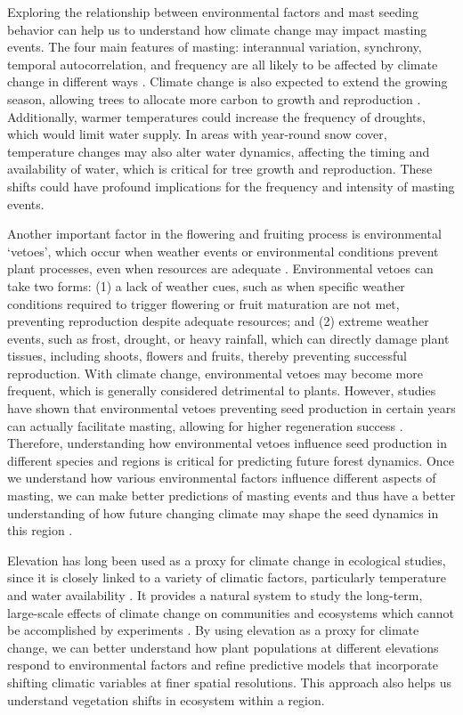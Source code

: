 \documentclass[11pt,letter]{article}
\begin{document}
Exploring the relationship between environmental factors and mast seeding behavior can help us to understand how climate change may impact masting events. The four main features of masting: interannual variation, synchrony, temporal autocorrelation, and frequency are all likely to be affected by climate change in different ways \citep{hacket2021climate}. Climate change is also expected to extend the growing season, allowing trees to allocate more carbon to growth and reproduction \citep{keenan2014net}. Additionally, warmer temperatures could increase the frequency of droughts, which would limit water supply. In areas with year-round snow cover, temperature changes may also alter water dynamics, affecting the timing and availability of water, which is critical for tree growth and reproduction. These shifts could have profound implications for the frequency and intensity of masting events.\par

Another important factor in the flowering and fruiting process is environmental `vetoes', which occur when weather events or environmental conditions prevent plant processes, even when resources are adequate \citep{bogdziewicz2022will}. Environmental vetoes can take two forms: (1) a lack of weather cues, such as when specific weather conditions required to trigger flowering or fruit maturation are not met, preventing reproduction despite adequate resources; and (2) extreme weather events, such as frost, drought, or heavy rainfall, which can directly damage plant tissues, including shoots, flowers and fruits, thereby preventing successful reproduction. With climate change, environmental vetoes may become more frequent, which is generally considered detrimental to plants. However, studies have shown that environmental vetoes preventing seed production in certain years can actually facilitate masting, allowing for higher regeneration success \citep{bogdziewicz2018correlated, bogdziewicz2019environmental}. Therefore, understanding how environmental vetoes influence seed production in different species and regions is critical for predicting future forest dynamics.  Once we understand how various environmental factors influence different aspects of masting, we can make better predictions of masting events and thus have a better understanding of how future changing climate may shape the seed dynamics in this region \citep{hacket2021climate}.\par

Elevation has long been used as a proxy for climate change in ecological studies, since it is closely linked to a variety of climatic factors, particularly temperature and water availability \citep{korner2007use}. It provides a natural system to study the long-term, large-scale effects of climate change on communities and ecosystems which cannot be accomplished by experiments \citep{sundqvist2013community}. By using elevation as a proxy for climate change, we can better understand how plant populations at different elevations respond to environmental factors and refine predictive models that incorporate shifting climatic variables at finer spatial resolutions. This approach also helps us understand vegetation shifts in ecosystem within a region.\par
\end{document}
